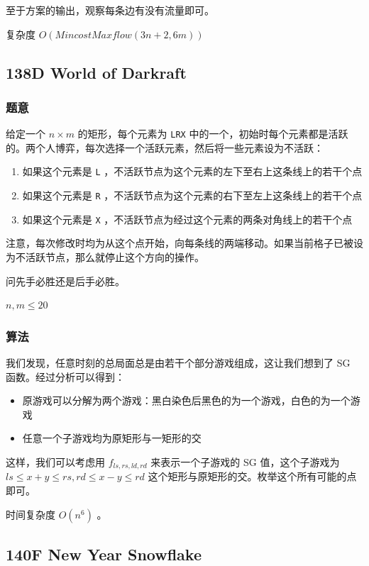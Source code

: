 \documentclass[11pt]{article}
\begin{document}
    至于方案的输出，观察每条边有没有流量即可。

    复杂度 $O(MincostMaxflow (3n + 2, 6m))$
\subsection{138D  World of Darkraft}
\label{sec-9-2}
\subsubsection{题意}
\label{sec-9-2-1}

    给定一个 $n \times m$ 的矩形，每个元素为 \texttt{LRX} 中的一个，初始时每个元素都是活跃的。两个人博弈，每次选择一个活跃元素，然后将一些元素设为不活跃：
\begin{enumerate}
\item 如果这个元素是 \texttt{L} ，不活跃节点为这个元素的左下至右上这条线上的若干个点
\item 如果这个元素是 \texttt{R} ，不活跃节点为这个元素的右下至左上这条线上的若干个点
\item 如果这个元素是 \texttt{X} ，不活跃节点为经过这个元素的两条对角线上的若干个点
\end{enumerate}
    注意，每次修改时均为从这个点开始，向每条线的两端移动。如果当前格子已被设为不活跃节点，那么就停止这个方向的操作。

    问先手必胜还是后手必胜。

    $n, m \leq 20$
\subsubsection{算法}
\label{sec-9-2-2}

    我们发现，任意时刻的总局面总是由若干个部分游戏组成，这让我们想到了 SG 函数。经过分析可以得到：
\begin{theorem}
  \begin{itemize}
  \item 原游戏可以分解为两个游戏：黑白染色后黑色的为一个游戏，白色的为一个游戏
  \item 任意一个子游戏均为原矩形与一矩形的交
  \end{itemize}
\end{theorem}

    这样，我们可以考虑用 $f_{ls, rs, ld, rd}$ 来表示一个子游戏的 SG 值，这个子游戏为 $ls \leq x + y \leq rs, rd \leq x - y \leq rd$  这个矩形与原矩形的交。枚举这个所有可能的点即可。

    时间复杂度 $O(n^6)$ 。
\subsection{140F  New Year Snowflake}
\label{sec-9-3}
\end{document}
